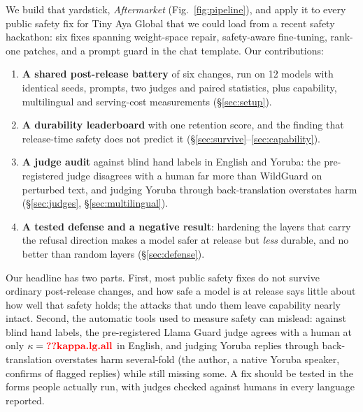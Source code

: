 We build that yardstick, \emph{Aftermarket} (Fig.~\ref{fig:pipeline}), and apply it to every public safety fix for Tiny Aya Global
\citep{salamanca2026tinyaya} that we could load from a recent safety hackathon: six fixes spanning weight-space repair,
safety-aware fine-tuning, rank-one patches, and a prompt guard in the chat template. Our contributions:
\begin{enumerate}
\item \textbf{A shared post-release battery} of six changes, run on 12 models with identical seeds, prompts, two
  judges and paired statistics, plus capability, multilingual and serving-cost measurements\stagetwo{}
  (\S\ref{sec:setup}).
\item \textbf{A durability leaderboard} with one retention score, and the finding that release-time safety does
  not predict it (\S\ref{sec:survive}--\ref{sec:capability}).
\item \textbf{A judge audit} against blind hand labels in English and Yoruba: the pre-registered judge disagrees
  with a human far more than WildGuard on perturbed text, and judging Yoruba through back-translation overstates
  harm (\S\ref{sec:judges}, \S\ref{sec:multilingual}).
\item \textbf{A tested defense and a negative result}: hardening the layers that carry the refusal direction makes
  a model safer at release but \emph{less} durable, and no better than random layers (\S\ref{sec:defense}).
\end{enumerate}
Our headline has two parts. First, most public safety fixes do not survive ordinary post-release changes, and how
safe a model is at release says little about how well that safety holds; the attacks that undo them leave
capability nearly intact. Second, the automatic tools used to measure safety can mislead: against blind hand
labels, the pre-registered Llama Guard judge agrees with a human at only $\kappa=\V{kappa.lg.all}$ in English, and
judging Yoruba replies through back-translation overstates harm several-fold (the author, a native Yoruba speaker, confirms
 of  flagged replies) while still missing some. A fix should be tested in the
forms people actually run, with judges checked against humans in every language reported.
